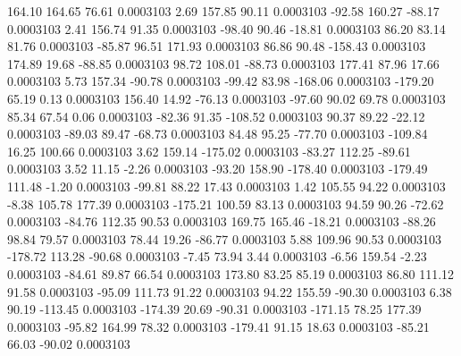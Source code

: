       164.10      164.65       76.61     0.0003103
        2.69      157.85       90.11     0.0003103
      -92.58      160.27      -88.17     0.0003103
        2.41      156.74       91.35     0.0003103
      -98.40       90.46      -18.81     0.0003103
       86.20       83.14       81.76     0.0003103
      -85.87       96.51      171.93     0.0003103
       86.86       90.48     -158.43     0.0003103
      174.89       19.68      -88.85     0.0003103
       98.72      108.01      -88.73     0.0003103
      177.41       87.96       17.66     0.0003103
        5.73      157.34      -90.78     0.0003103
      -99.42       83.98     -168.06     0.0003103
     -179.20       65.19        0.13     0.0003103
      156.40       14.92      -76.13     0.0003103
      -97.60       90.02       69.78     0.0003103
       85.34       67.54        0.06     0.0003103
      -82.36       91.35     -108.52     0.0003103
       90.37       89.22      -22.12     0.0003103
      -89.03       89.47      -68.73     0.0003103
       84.48       95.25      -77.70     0.0003103
     -109.84       16.25      100.66     0.0003103
        3.62      159.14     -175.02     0.0003103
      -83.27      112.25      -89.61     0.0003103
        3.52       11.15       -2.26     0.0003103
      -93.20      158.90     -178.40     0.0003103
     -179.49      111.48       -1.20     0.0003103
      -99.81       88.22       17.43     0.0003103
        1.42      105.55       94.22     0.0003103
       -8.38      105.78      177.39     0.0003103
     -175.21      100.59       83.13     0.0003103
       94.59       90.26      -72.62     0.0003103
      -84.76      112.35       90.53     0.0003103
      169.75      165.46      -18.21     0.0003103
      -88.26       98.84       79.57     0.0003103
       78.44       19.26      -86.77     0.0003103
        5.88      109.96       90.53     0.0003103
     -178.72      113.28      -90.68     0.0003103
       -7.45       73.94        3.44     0.0003103
       -6.56      159.54       -2.23     0.0003103
      -84.61       89.87       66.54     0.0003103
      173.80       83.25       85.19     0.0003103
       86.80      111.12       91.58     0.0003103
      -95.09      111.73       91.22     0.0003103
       94.22      155.59      -90.30     0.0003103
        6.38       90.19     -113.45     0.0003103
     -174.39       20.69      -90.31     0.0003103
     -171.15       78.25      177.39     0.0003103
      -95.82      164.99       78.32     0.0003103
     -179.41       91.15       18.63     0.0003103
      -85.21       66.03      -90.02     0.0003103
